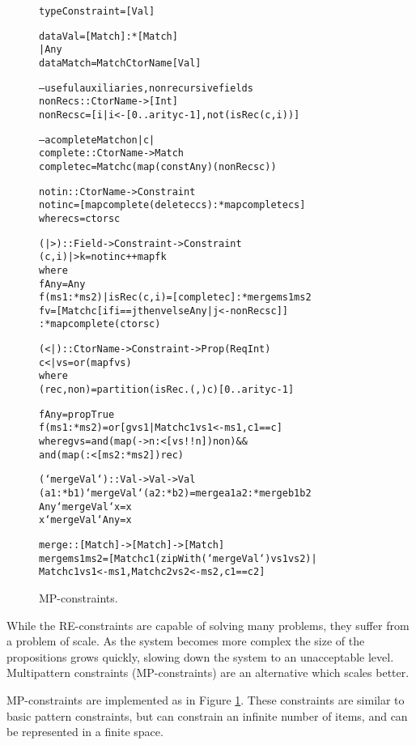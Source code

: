 \documentclass[preprint]{sigplanconf}
\newenvironment{code}{\begin{alltt}\small}{\end{alltt}}
\begin{document}
\begin{figure}
\begin{code}
type Constraint = [Val]

data Val    =  [Match] :* [Match]
            |  Any
data Match  =  Match CtorName [Val]

-- useful auxiliaries, non recursive fields
nonRecs :: CtorName -> [Int]
nonRecs c = [i | i <- [0..arity c-1], not (isRec (c,i))]

-- a complete Match on |c|
complete :: CtorName -> Match
complete c = Match c (map (const Any) (nonRecs c))

notin :: CtorName -> Constraint
notin c = [map complete (delete c cs) :* map complete cs]
    where cs = ctors c

(|>) :: Field -> Constraint -> Constraint
(c,i) |> k = notin c ++ map f k
    where
    f Any = Any
    f (ms1 :* ms2) | isRec (c,i) = [complete c] :* merge ms1 ms2
    f v =  [Match c [if i == j then v else Any | j <- nonRecs c]]
           :* map complete (ctors c)

(<|) :: CtorName -> Constraint -> Prop (Req Int)
c <| vs = or (map f vs)
    where
    (rec,non) = partition (isRec . (,) c) [0..arity c-1]

    f Any = propTrue
    f (ms1 :* ms2) = or [g vs1 | Match c1 vs1 <- ms1, c1 == c]
        where g vs =  and (map (\n -> n :< [vs !! n]) non) &&
                      and (map (:< [ms2 :* ms2]) rec)

(`mergeVal`) :: Val -> Val -> Val
(a1 :* b1) `mergeVal` (a2 :* b2)  = merge a1 a2 :* merge b1 b2
Any        `mergeVal` x           = x
x          `mergeVal` Any         = x

merge :: [Match] -> [Match] -> [Match]
merge  ms1 ms2 = [Match c1 (zipWith (`mergeVal`) vs1 vs2) |
       Match c1 vs1 <- ms1, Match c2 vs2 <- ms2, c1 == c2]
\end{code}
\caption{MP-constraints.}
\label{fig:enumeration}
\end{figure}

While the RE-constraints are capable of solving many problems, they suffer from a problem of scale. As the system becomes more complex the size of the propositions grows quickly, slowing down the system to an unacceptable level. Multipattern constraints (MP-constraints) are an alternative which scales better.

MP-constraints are implemented as in Figure \ref{fig:enumeration}. These constraints are similar to basic pattern constraints, but can constrain an infinite number of items, and can be represented in a finite space.
\end{document}
